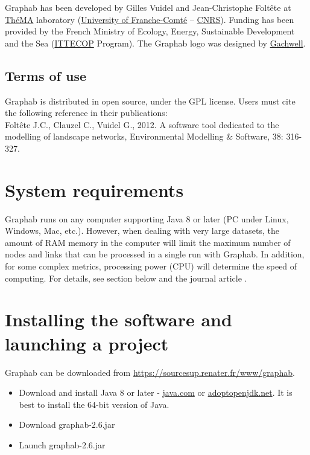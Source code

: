 \documentclass[a4paper,10pt]{report}
\begin{document}
Graphab has been developed by Gilles Vuidel and Jean-Christophe Foltête at \href{http://thema.univ-fcomte.fr/}{ThéMA} laboratory (\href{http://www.univ-fcomte.fr}{University of Franche-Comté} – \href{http://www.cnrs.fr}{CNRS}). Funding has been provided by the French Ministry of Ecology, Energy, Sustainable Development and the Sea (\href{http://www.ittecop.fr/}{ITTECOP} Program). The Graphab logo was designed by \href{http://www.gachwell.com/}{Gachwell}.

\subsection{Terms of use}

Graphab is distributed in open source, under the GPL license. Users must cite the following reference \cite{2012_graphab_EMS} in their publications:\\
Foltête J.C., Clauzel C., Vuidel G., 2012. A software tool dedicated to the modelling of landscape networks, Environmental Modelling \& Software, 38: 316-327.


\section{System requirements}

Graphab runs on any computer supporting Java 8 or later (PC under Linux, Windows, Mac, etc.). However, when dealing with very large datasets, the amount of RAM memory in the computer will limit the maximum number of nodes and links that can be processed in a single run with Graphab. In addition, for some complex metrics, processing power (CPU) will determine the speed of computing. For details, see section  below and the journal article  \cite{2012_graphab_EMS}.

\section{Installing the software and launching a project}

Graphab can be downloaded from \url{https://sourcesup.renater.fr/www/graphab}.

\begin{itemize}
	\item Download and install Java 8 or later - \href{http://www.java.com}{java.com} or \href{https://adoptopenjdk.net}{adoptopenjdk.net}. It is best to install the 64-bit version of Java.
	\item Download graphab-2.6.jar
	\item Launch graphab-2.6.jar
\end{itemize}
\end{document}
